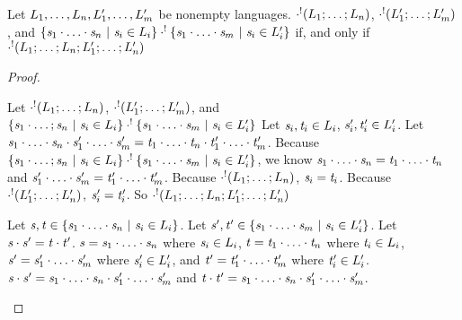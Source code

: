\documentclass[numbers,10pt,preprint\ifanon ,nocopyrightspace\fi]{sigplanconf}
\begin{document}
\begin{lemma}
  \label{lem:unambig-concat-equiv}
  Let $L_1,\ldots,L_n,L_1',\ldots,L_m'$ be
  nonempty languages. $\cdot^!(L_1;\ldots;L_n)$,
  $\cdot^!(L_1';\ldots;L_m')$, and
  $\{\mathit{s}_1\cdot\ldots\cdot\mathit{s}_n ~|~ \mathit{s}_i \in
    L_i\} \cdot^!
  \{\mathit{s}_1\cdot\ldots\cdot\mathit{s}_m ~|~ \mathit{s}_i \in
    L_i'\}$ if, and only if
  $\cdot^!(L_1;\ldots;L_n;L_1';\ldots;L_n')$
\end{lemma}
\begin{proof}
  \begin{case}[$\Rightarrow$]
    Let $\cdot^!(L_1;\ldots;L_n)$,
    $\cdot^!(L_1';\ldots;L_m')$, and
    $\{\mathit{s}_1\cdot\ldots;\mathit{s}_n ~|~ \mathit{s}_i \in
      L_i\} \cdot^!
    \{\mathit{s}_1\cdot\ldots\cdot\mathit{s}_m ~|~ \mathit{s}_i \in
      L_i'\}$
    Let $\mathit{s}_i,\mathit{t}_i\in L_i$,
    $\mathit{s}_i',\mathit{t}_i'\in L_i'$.
    Let
    $\mathit{s}_1\cdot\ldots\cdot\mathit{s}_n\cdot\mathit{s}_1'\cdot\ldots\cdot\mathit{s}_m'
    =
    \mathit{t}_1\cdot\ldots\cdot\mathit{t}_n\cdot\mathit{t}_1'\cdot\ldots\cdot\mathit{t}_m'$.
    Because $\{\mathit{s}_1\cdot\ldots;\mathit{s}_n ~|~ \mathit{s}_i \in
      L_i\} \cdot^!
    \{\mathit{s}_1\cdot\ldots\cdot\mathit{s}_m ~|~ \mathit{s}_i \in
      L_i'\}$, we know
    $\mathit{s}_1\cdot\ldots\cdot\mathit{s}_n =
    \mathit{t}_1\cdot\ldots\cdot\mathit{t}_n$ and
    $\mathit{s}_1'\cdot\ldots\cdot\mathit{s}_m' =
    \mathit{t}_1'\cdot\ldots\cdot\mathit{t}_m'$.
    Because $\cdot^!(L_1;\ldots;L_n)$,
    $\mathit{s}_i = \mathit{t}_i$.
    Because $\cdot^!(L_1';\ldots;L_n')$,
    $\mathit{s}_i' = \mathit{t}_i'$.
    So
    $\cdot^!(L_1;\ldots;L_n;L_1';\ldots;L_n')$
  \end{case}
  
  \begin{case}[$\Leftarrow$]
    Let $\mathit{s},\mathit{t}\in
    \{\mathit{s}_1\cdot\ldots\cdot\mathit{s}_n ~|~ \mathit{s}_i \in
      L_i\}$.
    Let $\mathit{s}',\mathit{t}'\in
    \{\mathit{s}_1\cdot\ldots\cdot\mathit{s}_m ~|~ \mathit{s}_i \in
      L_i'\}$.
    Let $\mathit{s}\cdot\mathit{s}' = \mathit{t}\cdot\mathit{t}'$.
    $\mathit{s}=\mathit{s}_1\cdot\ldots\cdot\mathit{s}_n$ where
    $\mathit{s}_i \in L_i$,
    $\mathit{t}=\mathit{t}_1\cdot\ldots\cdot\mathit{t}_n$ where
    $\mathit{t}_i \in L_i$,
    $\mathit{s}'=\mathit{s}_1'\cdot\ldots\cdot\mathit{s}_m'$ where
    $\mathit{s}_i' \in L_i'$, and
    $\mathit{t}'=\mathit{t}_1'\cdot\ldots\cdot\mathit{t}_m'$ where
    $\mathit{t}_i' \in L_i'$.
    $\mathit{s}\cdot\mathit{s}'=\mathit{s}_1\cdot\ldots\cdot\mathit{s}_n
    \cdot\mathit{s}_1'\cdot\ldots\cdot\mathit{s}_m'$ and
    $\mathit{t}\cdot\mathit{t}'=\mathit{s}_1\cdot\ldots\cdot\mathit{s}_n
    \cdot\mathit{s}_1'\cdot\ldots\cdot\mathit{s}_m'$.
    

\end{case}
\end{proof}
\end{document}
